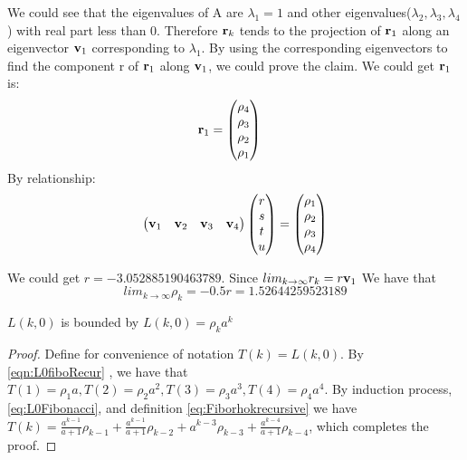 We could see that the eigenvalues of A are $\lambda_1 = 1$ and other eigenvalues($\lambda_2, \lambda_3, \lambda_4$) with real part less than 0. Therefore $\mathbf{r}_k$ tends to the projection of $\mathbf{r}_1$ along an eigenvector $\mathbf{v}_1$ corresponding to $\lambda_1$. By using the corresponding eigenvectors to find the component r of $\mathbf{r}_1$ along $\mathbf{v}_1$, we could prove the claim. 
We could get $\mathbf{r}_1$ is:
\begin{alignat*}{2}
\mathbf{r}_{1} & = 
\begin{pmatrix}
\rho_{4} \\
\rho_{3} \\
\rho_{2} \\
\rho_{1}
\end{pmatrix} 
\end{alignat*}
By relationship:
$$\begin{pmatrix}
\mathbf{v}_1 & \mathbf{v}_2 & \mathbf{v}_3 & \mathbf{v}_4  
\end{pmatrix} 
\begin{pmatrix}
r\\
s\\
t\\
u   
\end{pmatrix} = 
\begin{pmatrix}
\rho_1\\
\rho_2\\
\rho_3\\
\rho_4
\end{pmatrix}
$$ 

We could get $r = -3.052885190463789$. Since $lim_{k\rightarrow\infty}r_k=r\mathbf{v}_1$ We have that
\begin{equation}
lim_{k\rightarrow\infty}\rho_{k}=-0.5r=1.52644259523189
\end{equation}

\begin{lemma}
	\label{lemma:rhok_Fibo}
	$L(k,0)$ is bounded by $L(k,0)=\rho_{k}a^k$
\end{lemma}

\begin{proof}
	Define for convenience of notation $T(k) = L(k, 0)$.
	By \eqref{eqn:L0fiboRecur} , 
	we have that $T(1) = \rho_1 a, T(2)=\rho_{2}a^2, T(3) = \rho_{3}a^3, T(4)=\rho_{4}a^4$.
	By induction process, \eqref{eq:L0Fibonacci}, and definition \eqref{eq:Fiborhokrecursive} we have $T(k)=\frac{a^{k-1}}{a+1}\rho_{k-1}+\frac{a^{k-1}}{a+1}\rho_{k-2}+a^{k-3}\rho_{k-3}+\frac{a^{k-4}}{a+1}\rho_{k-4}$, which completes the proof.
\end{proof}

